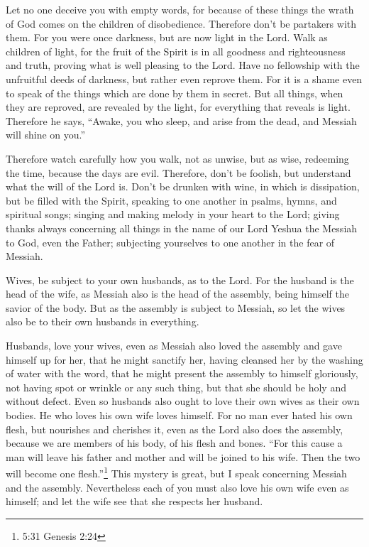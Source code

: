 \myverse{}Let no one deceive you with empty words, for because of these things
the wrath of God comes on the children of disobedience.
\myverse{}Therefore don’t be partakers with them.
\myverse{}For you were once darkness, but are now light in the Lord. Walk as children
of light,
\myverse{}for the fruit of the Spirit is in all goodness and righteousness and truth,
\myverse{}proving what is well pleasing to the Lord.
\myverse{}Have no fellowship with the unfruitful deeds of darkness, but rather even
reprove them.
\myverse{}For it is a shame even to speak of the things which are done by them in secret.
\myverse{}But all things, when they are reproved, are revealed by the light, for everything
that reveals is light.
\myverse{}Therefore he says, “Awake, you who sleep, and arise from the dead, and Messiah
will shine on you.”

\myverse{}Therefore watch carefully how you walk, not as unwise, but as
wise,
\myverse{}redeeming the time, because the days are evil.
\myverse{}Therefore, don’t be foolish, but understand what the will of the Lord is.
\myverse{}Don’t be drunken with wine, in which is dissipation, but be filled with the
Spirit,
\myverse{}speaking to one another in psalms, hymns, and spiritual songs; singing and
making melody in your heart to the Lord;
\myverse{}giving thanks always concerning all things in the name of our Lord Yeshua the Messiah
to God, even the Father;
\myverse{}subjecting yourselves to one another in the fear of Messiah.

\myverse{}Wives, be subject to your own husbands, as to the Lord.
\myverse{}For the husband is the head of the wife, as Messiah also is the head of the
assembly, being himself the savior of the body.
\myverse{}But as the assembly is subject to Messiah, so let the wives also be to their
own husbands in everything.

\myverse{}Husbands, love your wives, even as Messiah also loved the assembly
and gave himself up for her,
\myverse{}that he might sanctify her, having cleansed her by the washing of water with
the word,
\myverse{}that he might present the assembly to himself gloriously, not having spot
or wrinkle or any such thing, but that she should be holy and without defect.
\myverse{}Even so husbands also ought to love their own wives as their own bodies. He
who loves his own wife loves himself.
\myverse{}For no man ever hated his own flesh, but nourishes and cherishes it, even
as the Lord also does the assembly,
\myverse{}because we are members of his body, of his flesh and bones.
\myverse{}“For this cause a man will leave his father and mother and will be joined
to his wife. Then the two will become one flesh.”\footnote{5:31 Genesis 2:24}
\myverse{}This mystery is great, but I speak concerning Messiah and the assembly.
\myverse{}Nevertheless each of you must also love his own wife even as himself; and
let the wife see that she respects her husband.



